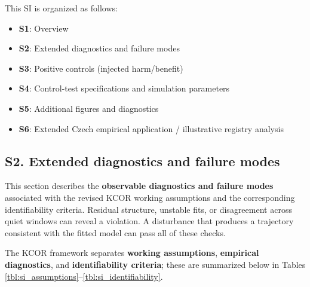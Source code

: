 \documentclass[
]{article}
\providecommand{\tightlist}{%
  \setlength{\itemsep}{0pt}\setlength{\parskip}{0pt}}
\begin{document}
This SI is organized as follows:

\begin{itemize}
\tightlist
\item
  \textbf{S1}: Overview
\item
  \textbf{S2}: Extended diagnostics and failure modes
\item
  \textbf{S3}: Positive controls (injected harm/benefit)
\item
  \textbf{S4}: Control-test specifications and simulation parameters
\item
  \textbf{S5}: Additional figures and diagnostics
\item
  \textbf{S6}: Extended Czech empirical application / illustrative registry analysis
\end{itemize}

\subsection{S2. Extended diagnostics and failure modes}\label{s2.-extended-diagnostics-and-failure-modes}

This section describes the \textbf{observable diagnostics and failure modes} associated with the revised KCOR working assumptions and the corresponding identifiability criteria. Residual structure, unstable fits, or disagreement across quiet windows can reveal a violation. A disturbance that produces a trajectory consistent with the fitted model can pass all of these checks.

The KCOR framework separates \textbf{working assumptions}, \textbf{empirical diagnostics}, and \textbf{identifiability criteria}; these are summarized below in Tables \ref{tbl:si_assumptions}--\ref{tbl:si_identifiability}.
\end{document}
